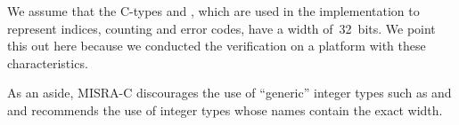 We assume that the C-types  and , which
are used in the implementation to represent indices, counting and error codes,
have a width of~32~bits.
We point this out here because we conducted the verification on a platform with
these characteristics.

As an aside, MISRA-C discourages the use of ``generic'' integer types
such as  and  and recommends the use of integer types whose names
contain the exact width.

